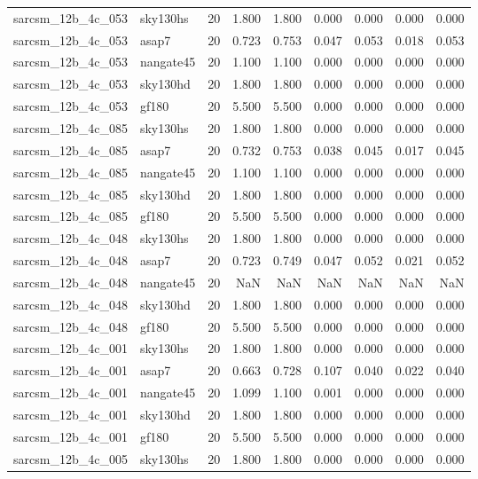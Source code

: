 \begin{tabular}{llrrrrrrr}
sarcsm\_12b\_4c\_053 & sky130hs & 20 & 1.800 & 1.800 & 0.000 & 0.000 & 0.000 & 0.000 \\
sarcsm\_12b\_4c\_053 & asap7 & 20 & 0.723 & 0.753 & 0.047 & 0.053 & 0.018 & 0.053 \\
sarcsm\_12b\_4c\_053 & nangate45 & 20 & 1.100 & 1.100 & 0.000 & 0.000 & 0.000 & 0.000 \\
sarcsm\_12b\_4c\_053 & sky130hd & 20 & 1.800 & 1.800 & 0.000 & 0.000 & 0.000 & 0.000 \\
sarcsm\_12b\_4c\_053 & gf180 & 20 & 5.500 & 5.500 & 0.000 & 0.000 & 0.000 & 0.000 \\
sarcsm\_12b\_4c\_085 & sky130hs & 20 & 1.800 & 1.800 & 0.000 & 0.000 & 0.000 & 0.000 \\
sarcsm\_12b\_4c\_085 & asap7 & 20 & 0.732 & 0.753 & 0.038 & 0.045 & 0.017 & 0.045 \\
sarcsm\_12b\_4c\_085 & nangate45 & 20 & 1.100 & 1.100 & 0.000 & 0.000 & 0.000 & 0.000 \\
sarcsm\_12b\_4c\_085 & sky130hd & 20 & 1.800 & 1.800 & 0.000 & 0.000 & 0.000 & 0.000 \\
sarcsm\_12b\_4c\_085 & gf180 & 20 & 5.500 & 5.500 & 0.000 & 0.000 & 0.000 & 0.000 \\
sarcsm\_12b\_4c\_048 & sky130hs & 20 & 1.800 & 1.800 & 0.000 & 0.000 & 0.000 & 0.000 \\
sarcsm\_12b\_4c\_048 & asap7 & 20 & 0.723 & 0.749 & 0.047 & 0.052 & 0.021 & 0.052 \\
sarcsm\_12b\_4c\_048 & nangate45 & 20 & NaN & NaN & NaN & NaN & NaN & NaN \\
sarcsm\_12b\_4c\_048 & sky130hd & 20 & 1.800 & 1.800 & 0.000 & 0.000 & 0.000 & 0.000 \\
sarcsm\_12b\_4c\_048 & gf180 & 20 & 5.500 & 5.500 & 0.000 & 0.000 & 0.000 & 0.000 \\
sarcsm\_12b\_4c\_001 & sky130hs & 20 & 1.800 & 1.800 & 0.000 & 0.000 & 0.000 & 0.000 \\
sarcsm\_12b\_4c\_001 & asap7 & 20 & 0.663 & 0.728 & 0.107 & 0.040 & 0.022 & 0.040 \\
sarcsm\_12b\_4c\_001 & nangate45 & 20 & 1.099 & 1.100 & 0.001 & 0.000 & 0.000 & 0.000 \\
sarcsm\_12b\_4c\_001 & sky130hd & 20 & 1.800 & 1.800 & 0.000 & 0.000 & 0.000 & 0.000 \\
sarcsm\_12b\_4c\_001 & gf180 & 20 & 5.500 & 5.500 & 0.000 & 0.000 & 0.000 & 0.000 \\
sarcsm\_12b\_4c\_005 & sky130hs & 20 & 1.800 & 1.800 & 0.000 & 0.000 & 0.000 & 0.000 \\

\end{tabular}
